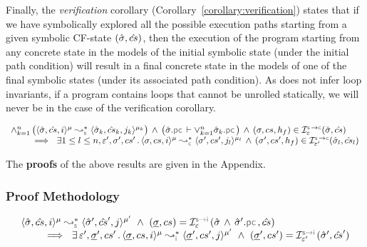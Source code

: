 Finally, the \emph{verification} corollary (Corollary~\ref{corollary:verification})
states that if we have symbolically explored all the possible execution paths
starting from a given symbolic CF-state $(\hat{\sigma}, \hat{cs})$,  
then the execution of the program starting from  any concrete state in the models 
of the initial symbolic state (under the initial path condition) will result in a final concrete state
in the models of one of the final symbolic states (under its associated path condition).  
As \cosette does not infer loop invariants, if a \jsil program contains loops that cannot be 
unrolled statically, we will never be in the case of the verification corollary. 

\begin{corollary}[Verification]\label{corollary:verification}
$$
\begin{array}{l}
\wedge_{k=1}^n \, \big( \transabssemrule{\sstate, \scs, i}{\sstate_k, \scs_k, j_k}{\mode}{\mode_k}{\symbolic}  \big)
    \, \wedge \, \big( \sstate.\pcsel \vdash \vee_{k=1}^n \sstate_k.\pcsel \big) 
    \, \wedge \, (\jstate, \cs, \heap_f) \in \interpret{\symbconc}{\senv}(\sstate, \scs)
    \\ \quad \quad
%
      \ \implies \ \exists 1 \leq l \leq n, \senv', \jstate', \cs' \, . \, 
           \transabssemrule{\jstate, \cs, i}{\jstate', \cs', j_l}{\mode}{\mode_l}{\concrete}
           \, \wedge \, 
           (\jstate', \cs', \heap_f) \in \interpret{\symbconc}{\senv'}(\sstate_l, \scs_l)
\end{array}
$$
\end{corollary}

%
The {\bf proofs} of the above results are given in the Appendix.  

\subsubsection{Proof Methodology}

\begin{theorem}\label{lemma:soundness:jsil:symb:exe:instrumented:instrumented}
$$
\begin{array}{l}
\transabssemrule{\sstate, \scs, i}{\sstate', \scs', j}{\mode}{\mode'}{\symbolic}  \ \wedge \ (\istate, \cs) = \interpret{\symbinst}{\senv}(\sstate \, \wedge \, \sstate'.\pcsel, \scs) \\ \quad \quad 
    \ \implies \ \exists \, \senv', \istate', \cs' \, . \, 
        \transabssemrule{\istate, \cs, i}{\istate', \cs', j}{\mode}{\mode'}{\instrumented} \ \wedge \ (\istate', \cs') = \interpret{\symbinst}{\senv'}(\sstate', \scs')
\end{array}
$$
\end{theorem}








